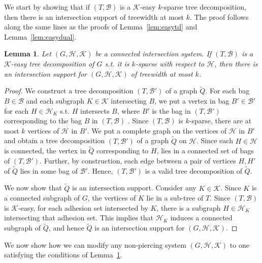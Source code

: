 \documentclass[12pt]{article}
\newcommand{\BB}{\mathcal{B}}
\newcommand{\HH}{\mathcal{H}}
\newcommand{\KK}{\mathcal{K}}
\newtheorem{lemma}[theorem]{Lemma}
\theoremstyle{case}
\begin{document}
We start by showing that if $(T,\mathcal{B})$ is a $\KK$-easy $k$-sparse tree decomposition, then there is an intersection support of treewidth at most $k$.
The proof follows along the same lines as the proofs of Lemma~\ref{lem:easytd} and Lemma~\ref{lem:easydual}. 

\begin{lemma}\label{lem:easyint}
Let $(G,\mathcal{H,K})$ be a connected intersection system.
If $(T,\mathcal{B})$ is a $\KK$-easy tree decomposition of $G$ s.t. it is $k$-sparse with respect to $\mathcal{H}$, 
then there is an intersection support for $(G,\mathcal{H,K})$ of treewidth at most $k$. 
\end{lemma}
\begin{proof}
We construct a tree decomposition $(T,\mathcal{B}')$ of a graph $\tilde{Q}$.
For each bag $B\in\mathcal{B}$ and each subgraph $K\in\KK$ intersecting $B$, we put a vertex in bag $B'\in\BB'$ for each $H\in\mathcal{H}_K$ s.t. $H$ intersects $B$, where $B'$ is the bag in $(T,\mathcal{B}')$ corresponding to the bag $B$ in $(T,\BB)$ . Since $(T,\mathcal{B})$ is $k$-sparse,
there are at most $k$ vertices of $\HH$ in $B'$. 
We put a complete graph on the vertices of $\mathcal{H}$ in $B'$ and obtain a tree decomposition $(T,\mathcal{B}')$ of a graph $\tilde{Q}$ on $\mathcal{H}$. Since each $H\in\mathcal{H}$ is connected, 
the vertex in $\tilde{Q}$ corresponding to $H$, lies in a connected set of bags of $(T,\mathcal{B}')$.
Further, by construction,
each edge between a pair of vertices $H, H'$ of $\tilde{Q}$ lies in some bag of $\mathcal{B}'$. Hence, $(T,\mathcal{B}')$ is a valid
tree decomposition of $\tilde{Q}$.

We now show that $\tilde{Q}$ is an intersection support.
Consider any $K\in\KK$.
Since $K$ is a connected subgraph of $G$, the vertices of $K$ lie in a sub-tree of $T$. 
Since $(T,\mathcal{B})$ is $\mathcal{K}$-easy, for each adhesion set intersected by $K$, there is a subgraph $H\in\mathcal{H}_K$
intersecting that adhesion set. This implies that $\mathcal{H}_K$ induces a connected subgraph of $\tilde{Q}$, and
hence $\tilde{Q}$ is an intersection support for $(G,\mathcal{H},\mathcal{K})$.
\end{proof}


We now show how we can modify any non-piercing system $(G,\mathcal{H,K})$ to one satisfying the conditions of Lemma~\ref{lem:easyint}.
\end{document}
